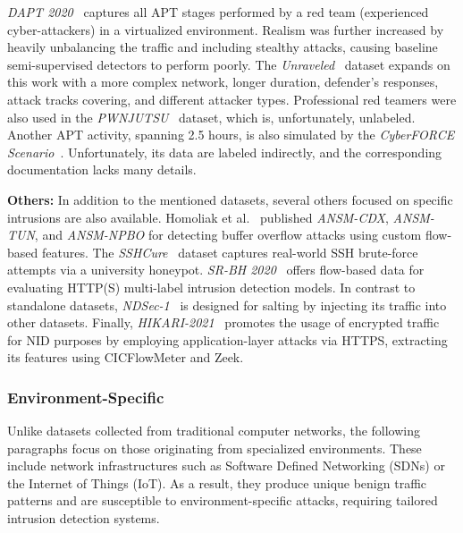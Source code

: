 \emph{DAPT 2020}~\cite{myneni2020_dapt2020} captures all APT stages performed by a red team (experienced cyber-attackers) in a virtualized environment. Realism was further increased by heavily unbalancing the traffic and including stealthy attacks, causing baseline semi-supervised detectors to perform poorly. The \emph{Unraveled}~\cite{myneni2023_unraveled} dataset expands on this work with a more complex network, longer duration, defender's responses, attack tracks covering, and different attacker types. Professional red teamers were also used in the \emph{PWNJUTSU}~\cite{berady2022_pwnjutsu_dataset} dataset, which is, unfortunately, unlabeled. Another APT activity, spanning 2.5 hours, is also simulated by the \emph{CyberFORCE Scenario}~\cite{cybervan2021_cyberforce_scenario}. Unfortunately, its data are labeled indirectly, and the corresponding documentation lacks many details.

\textbf{Others:}
In addition to the mentioned datasets, several others focused on specific intrusions are also available. Homoliak et al.~\cite{homoliak2020_asnm_datasets} published \emph{ANSM-CDX}, \emph{ANSM-TUN}, and \emph{ANSM-NPBO} for detecting buffer overflow attacks using custom flow-based features. The \emph{SSHCure}~\cite{hofstede2014_sshcure} dataset captures real-world SSH brute-force attempts via a university honeypot. \emph{SR-BH 2020}~\cite{riera2022_sr_bh2020} offers flow-based data for evaluating HTTP(S) multi-label intrusion detection models. In contrast to standalone datasets, \emph{NDSec-1}~\cite{beer2017_ndsec1} is designed for salting by injecting its traffic into other datasets. Finally, \emph{HIKARI-2021}~\cite{ferriyan2021_hikari2021} promotes the usage of encrypted traffic for NID purposes by employing application-layer attacks via HTTPS, extracting its features using CICFlowMeter and Zeek.

\subsubsection{Environment-Specific}

Unlike datasets collected from traditional computer networks, the following paragraphs focus on those originating from specialized environments. These include network infrastructures such as Software Defined Networking (SDNs) or the Internet of Things (IoT). As a result, they produce unique benign traffic patterns and are susceptible to environment-specific attacks, requiring tailored intrusion detection systems.


